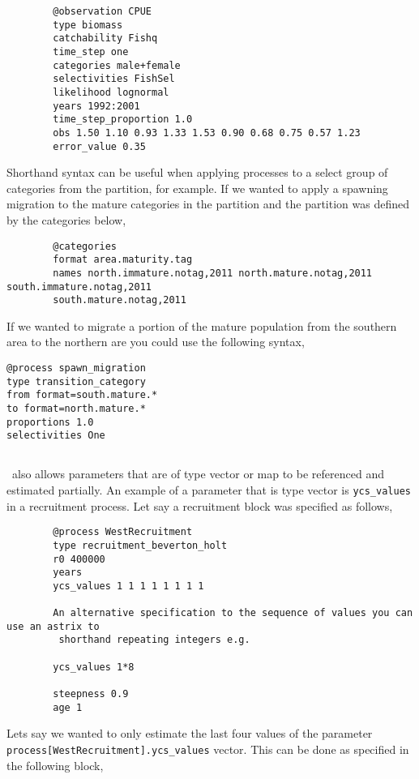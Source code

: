 {\small{\begin{verbatim}
		@observation CPUE
		type biomass
		catchability Fishq
		time_step one
		categories male+female
		selectivities FishSel
		likelihood lognormal
		years 1992:2001
		time_step_proportion 1.0
		obs 1.50 1.10 0.93 1.33 1.53 0.90 0.68 0.75 0.57 1.23
		error_value 0.35
\end{verbatim}}}

Shorthand syntax can be useful when applying processes to a select group of categories from the partition, for example. If we wanted to apply a spawning migration to the mature categories in the partition and the partition was defined by the categories below,
{\small{\begin{verbatim}
		@categories 
		format area.maturity.tag
		names north.immature.notag,2011 north.mature.notag,2011 south.immature.notag,2011
		south.mature.notag,2011		
		\end{verbatim}}}	

If we wanted to migrate a portion of the mature population from the southern area to the northern are you could use the following syntax,

{\small{\begin{verbatim}
@process spawn_migration
type transition_category 		
from format=south.mature.*	
to format=north.mature.*
proportions 1.0
selectivities One
\end{verbatim}}}


\subsection{\label{sec:params}}
\CNAME\ also allows parameters that are of type vector or map to be referenced and estimated partially. An example of a parameter that is type vector is \texttt{ycs\_values} in a recruitment process. Let say a recruitment block was specified as follows,
{\small{\begin{verbatim}
		@process WestRecruitment
		type recruitment_beverton_holt
		r0 400000
		years
		ycs_values 1 1 1 1 1 1 1 1 
		
		An alternative specification to the sequence of values you can use an astrix to
		 shorthand repeating integers e.g.
				
		ycs_values 1*8
				
		steepness 0.9
		age 1
\end{verbatim}}}

Lets say we wanted to only estimate the last four values of the parameter \texttt{process[WestRecruitment].ycs\_values} vector. This can be done as specified in the following  block,

